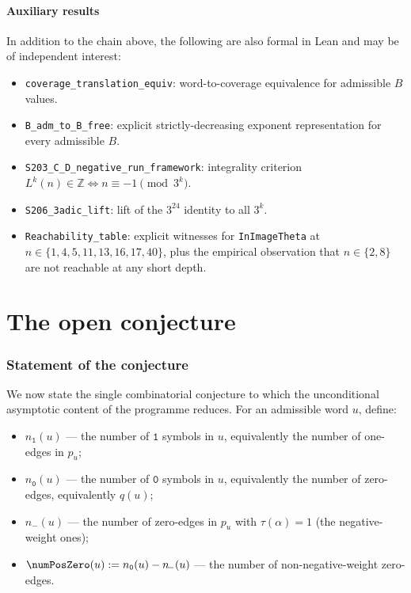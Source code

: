 \documentclass[11pt,a4paper]{article}
\theoremstyle{plain}
\theoremstyle{definition}
\newcommand{\ZZ}{\mathbb{Z}}
\newcommand{\numOnes}{n_{\mathtt{1}}}
\newcommand{\numNeg}{n_{\!-}}
\newcommand{\numZeros}{n_{\mathtt{0}}}
\begin{document}
\subsection{Auxiliary results}

In addition to the chain above, the following are also formal in
Lean and may be of independent interest:

\begin{itemize}
  \item \texttt{coverage\_translation\_equiv}: word-to-coverage
        equivalence for admissible $B$ values.
  \item \texttt{B\_adm\_to\_B\_free}: explicit strictly-decreasing
        exponent representation for every admissible $B$.
  \item \texttt{S203\_C\_D\_negative\_run\_framework}: integrality
        criterion $L^k(n) \in \ZZ \iff n \equiv -1 \pmod{3^k}$.
  \item \texttt{S206\_3adic\_lift}: lift of the $3^{24}$ identity to
        all $3^k$.
  \item \texttt{Reachability\_table}: explicit witnesses for
        \texttt{InImageTheta} at $n \in \{1, 4, 5, 11, 13, 16, 17, 40\}$,
        plus the empirical observation that $n \in \{2, 8\}$ are not
        reachable at any short depth.
\end{itemize}

\part{The open conjecture}\label{part:gap}

\section{Statement of the conjecture}\label{sec:open-conjecture}

We now state the single combinatorial conjecture to which the
unconditional asymptotic content of the programme reduces. For an
admissible word $u$, define:
\begin{itemize}
  \item $\numOnes(u)$ — the number of $\mathtt{1}$ symbols in $u$,
        equivalently the number of one-edges in $p_u$;
  \item $\numZeros(u)$ — the number of $\mathtt{0}$ symbols in $u$,
        equivalently the number of zero-edges, equivalently $q(u)$;
  \item $\numNeg(u)$ — the number of zero-edges in $p_u$ with
        $\tau(\alpha) = 1$ (the negative-weight ones);
  \item $\numPosZero(u) := \numZeros(u) - \numNeg(u)$ — the number
        of non-negative-weight zero-edges.
\end{itemize}
\end{document}
